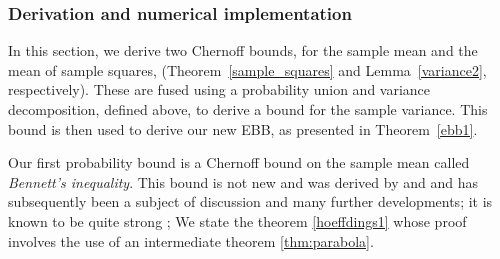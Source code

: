 




\subsubsection{Derivation and numerical implementation}
\label{derivation}
In this section, we derive two Chernoff bounds, 
for the sample mean and the mean of sample squares, (Theorem~\ref{sample_squares} and Lemma~\ref{variance2}, respectively). 
These are fused using a probability union and variance decomposition, defined above, to derive a bound for the sample variance. 
This bound is then used to derive our new EBB, as presented in Theorem~\ref{ebb1}.

Our first probability bound is a Chernoff bound on the sample mean called \textit{Bennett's inequality}. 
This bound is not new and was derived by \cite{hoeffding1} and \cite{10.2307/2282438} and has subsequently been a subject of discussion and many further developments; it is known to be quite strong \cite{Bentkus08boundsfor,Pinelis2014,zbMATH00812598}; 
We state the theorem \ref{hoeffdings1} whose proof involves the use of an intermediate theorem \ref{thm:parabola}.

